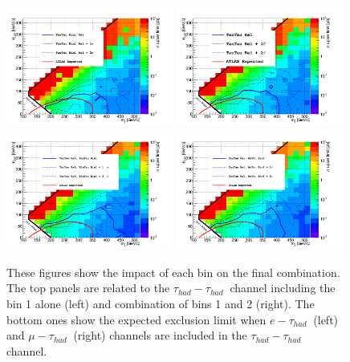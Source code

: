 \begin{linenomath}
\begin{figure}[h]
\centering
\includegraphics[width=0.49\textwidth,keepaspectratio=true]{StatisticsFig/NewFigs/TauTau_Bin1Rel.png}
\includegraphics[width=0.49\textwidth,keepaspectratio=true]{StatisticsFig/NewFigs/TauTau_Bin1Rel_Bin2.png}
\includegraphics[width=0.49\textwidth,keepaspectratio=true]{StatisticsFig/NewFigs/TauTau_EleTauBin1.png}
\includegraphics[width=0.49\textwidth,keepaspectratio=true]{StatisticsFig/NewFigs/TauTau_MuTauBin1.png}
\caption{These figures show the impact of each bin on the final combination. 
The top panels are related to the $\tau_{had}-\tau_{had}~$ channel including the bin 1 alone (left) and combination of bins 1 and 2 (right).
The bottom ones show the expected exclusion limit when $e-\tau_{had}~$ (left) and $\mu-\tau_{had}~$ (right) channels are included in the $\tau_{had}-\tau_{had}~$ channel.
}
\label{fig:limit_bins}
\end{figure}
\end{linenomath}


